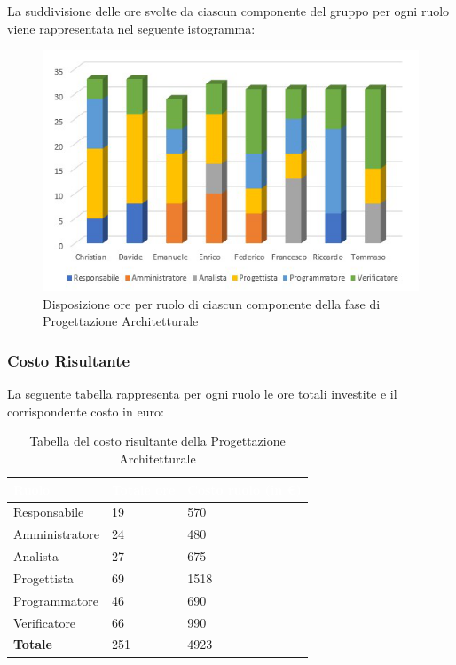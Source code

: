 La suddivisione delle ore svolte da ciascun componente del gruppo per ogni ruolo viene rappresentata nel seguente istogramma:
\begin{figure}[h!]
	\centering
	\includegraphics{Sezioni/Istogrammi/IstogrammaProgettArchitetturale.png}
	\caption{Disposizione ore per ruolo di ciascun componente della fase di Progettazione Architetturale}
\end{figure}

\clearpage

\subsubsection{Costo Risultante}
La seguente tabella rappresenta per ogni ruolo le ore totali investite e il corrispondente costo in euro:
{
\renewcommand{\arraystretch}{2}
\begin{longtable}{ C{3cm} C{2cm} C{4cm}}
\caption{Tabella del costo risultante della Progettazione Architetturale}\\

\textcolor{white}{\textbf{Ruolo}} & 
\textcolor{white}{\textbf{Totale ore}} & 
\textcolor{white}{\textbf{Costo ruolo (in \euro{})}}\\	
\endhead
        
Responsabile    &  19 &  570 \\
Amministratore  &  24 &  480 \\
Analista        &  27 &  675 \\
Progettista     &  69 & 1518 \\
Programmatore   &  46 &  690 \\
Verificatore    &  66 &  990 \\
\textbf{Totale} & 251 & 4923 \\	
        	
\end{longtable}
}

